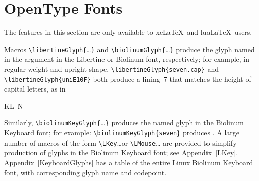 \documentclass[11pt]{article}
\begin{document}
\section{OpenType Fonts}
\label{OpenType}

The features in this section are only available to xe\LaTeX\ and lua\LaTeX\ users.

Macros \verb|\libertineGlyph{|\ldots\verb|}| and \verb|\biolinumGlyph{|\ldots\verb|}| produce the
glyph named in the argument in the Libertine or Biolinum font,
respectively; for example, in regular-weight and upright-shape,
\verb|\libertineGlyph{seven.cap}| and \verb|\libertineGlyph{uniE10F}| both produce a
lining~7 that matches the height of capital letters, as in
\begin{list}{}{}\item
KL~N
\end{list} 
Similarly, \verb|\biolinumKeyGlyph{|\ldots\verb|}| produces the named glyph
in the Biolinum Keyboard font; for example: \verb|\biolinumKeyGlyph{seven}| produces .
A large number of macros of the form \verb|\LKey|\ldots or \verb|\LMouse|\ldots
are provided to simplify production of glyphs in the Biolinum Keyboard font;
see Appendix~\ref{LKey}. Appendix~\ref{KeyboardGlyphs} has a table of the entire
Linux Biolinum Keyboard font, with corresponding glyph name and codepoint.
\end{document}
